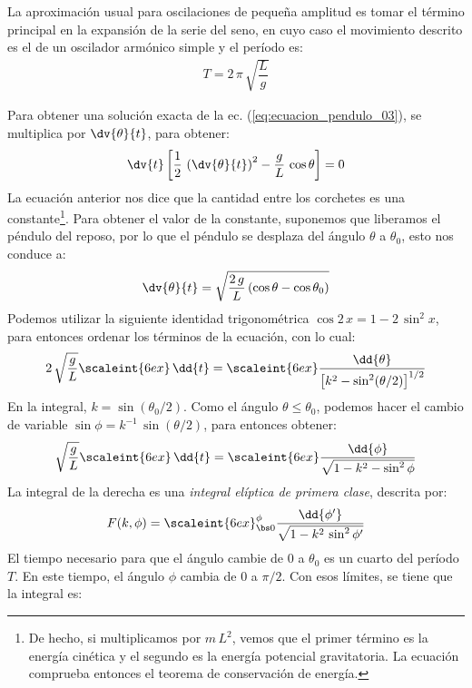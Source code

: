 La aproximación usual para oscilaciones de pequeña amplitud es tomar el término principal en la expansión de la serie del seno, en cuyo caso el movimiento descrito es el de un oscilador armónico simple y el período es:
\begin{align*}
T = 2 \, \pi \,\sqrt{\dfrac{L}{g}}
\end{align*}
\par
Para obtener una solución exacta de la ec. (\ref{eq:ecuacion_pendulo_03}), se multiplica por $\displaystyle{\dv{\theta}{t}}$, para obtener:
\begin{equation}
\dv{t} \left[ \dfrac{1}{2} \, \left( \dv{\theta}{t} \right)^{2} - \dfrac{g}{L} \, \cos \theta \right] = 0
\label{eq:ecuacion_pendulo_04}
\end{equation}
La ecuación anterior nos dice que la cantidad entre los corchetes es una constante\footnote{De hecho, si multiplicamos por $m \, L^{2}$, vemos que el primer término es la energía cinética y el segundo es la energía potencial gravitatoria. La ecuación comprueba entonces el teorema de conservación de energía.}. Para obtener el valor de la constante, suponemos que liberamos el péndulo del reposo, por lo que el péndulo se desplaza del ángulo $\theta$ a $\theta_{0}$, esto nos conduce a:
\begin{align*}
\dv{\theta}{t} = \sqrt{\dfrac{2 \, g}{L} \, (\cos \theta - \cos \theta_{0})}
\end{align*}
Podemos utilizar la siguiente identidad trigonométrica $\cos 2 \, x = 1 - 2 \, \sin^{2} x$, para entonces ordenar los términos de la ecuación, con lo cual:
\begin{align*}
2 \, \sqrt{\dfrac{g}{L}} \scaleint{6ex} \, \dd{t} = \scaleint{6ex} \dfrac{\dd{\theta}}{\big[ k^{2} - \sin^{2} (\theta/2) \big]^{1/2}}
\end{align*}
En la integral, $k = \sin (\theta_{0}/2)$. Como el ángulo $\theta \leq \theta_{0}$, podemos hacer el cambio de variable $\sin \phi = k^{-1} \, \sin (\theta/2)$, para entonces obtener:
\begin{align*}
\sqrt{\dfrac{g}{L}} \scaleint{6ex} \, \dd{t} = \scaleint{6ex} \dfrac{\dd{\phi}}{\sqrt{1 - k^{2} - \sin^{2} \phi}}
\end{align*}
La integral de la derecha es una \emph{integral elíptica de primera clase}, descrita por:
\begin{align*}
F(k , \phi) = \scaleint{6ex}_{\bs 0}^{\phi} \dfrac{\dd{\phi^{\prime}}}{\sqrt{1 - k^{2} \, \sin^{2} \phi^{\prime} }}
\end{align*}
El tiempo necesario para que el ángulo cambie de $0$ a $\theta_{0}$ es un cuarto del período $T$. En este tiempo, el ángulo $\phi$ cambia de $0$ a $\pi/2$. Con esos límites, se tiene que la integral es:
